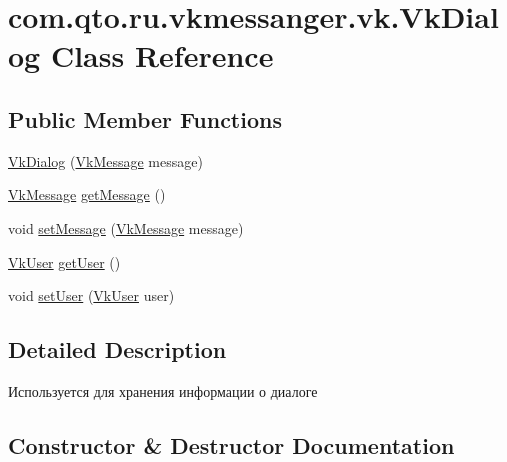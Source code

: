 \hypertarget{classcom_1_1qto_1_1ru_1_1vkmessanger_1_1vk_1_1_vk_dialog}{}\section{com.\+qto.\+ru.\+vkmessanger.\+vk.\+Vk\+Dialog Class Reference}
\label{classcom_1_1qto_1_1ru_1_1vkmessanger_1_1vk_1_1_vk_dialog}
\subsection*{Public Member Functions}
\begin{DoxyCompactItemize}
\item 
\hyperlink{classcom_1_1qto_1_1ru_1_1vkmessanger_1_1vk_1_1_vk_dialog_abc71f723b7711640f2dfccffb4cfa782}{Vk\+Dialog} (\hyperlink{classcom_1_1qto_1_1ru_1_1vkmessanger_1_1vk_1_1_vk_message}{Vk\+Message} message)
\item 
\hyperlink{classcom_1_1qto_1_1ru_1_1vkmessanger_1_1vk_1_1_vk_message}{Vk\+Message} \hyperlink{classcom_1_1qto_1_1ru_1_1vkmessanger_1_1vk_1_1_vk_dialog_a19a14078b7290d9e85c8b8c3b580f5a6}{get\+Message} ()
\item 
void \hyperlink{classcom_1_1qto_1_1ru_1_1vkmessanger_1_1vk_1_1_vk_dialog_abebe67cc4fbb8e6dd4dbf0f1b61706e1}{set\+Message} (\hyperlink{classcom_1_1qto_1_1ru_1_1vkmessanger_1_1vk_1_1_vk_message}{Vk\+Message} message)
\item 
\hyperlink{classcom_1_1qto_1_1ru_1_1vkmessanger_1_1vk_1_1_vk_user}{Vk\+User} \hyperlink{classcom_1_1qto_1_1ru_1_1vkmessanger_1_1vk_1_1_vk_dialog_a226d4205f08075cbb835225613bb628f}{get\+User} ()
\item 
void \hyperlink{classcom_1_1qto_1_1ru_1_1vkmessanger_1_1vk_1_1_vk_dialog_a195eab20870c528eed00dfd9db15ea89}{set\+User} (\hyperlink{classcom_1_1qto_1_1ru_1_1vkmessanger_1_1vk_1_1_vk_user}{Vk\+User} user)
\end{DoxyCompactItemize}


\subsection{Detailed Description}
Используется для хранения информации о диалоге 

\subsection{Constructor \& Destructor Documentation}
\hypertarget{classcom_1_1qto_1_1ru_1_1vkmessanger_1_1vk_1_1_vk_dialog_abc71f723b7711640f2dfccffb4cfa782}{}
